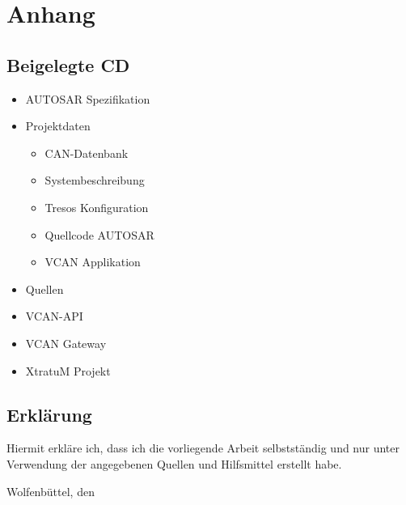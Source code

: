 \documentclass[
  a4paper,					    %
  twoside,
  DIV=calc,     				%
  bibliography=totoc,
  cleardoublepage=empty,
  ngerman,     					%
  final       					%
]{scrbook}
\begin{document}















\appendix
\part*{Anhang}





\backmatter


\chapter{Beigelegte CD}
\label{sec:BeigelegteCD}
\begin{itemize}
    \item AUTOSAR Spezifikation
    \item Projektdaten
    \begin{itemize}
        \item CAN-Datenbank
        \item Systembeschreibung
        \item Tresos Konfiguration
        \item Quellcode AUTOSAR
        \item VCAN Applikation
    \end{itemize}
    \item Quellen
    \item VCAN-API
    \item VCAN Gateway
    \item XtratuM Projekt
\end{itemize}


\chapter{Erklärung}
\label{sec:Erklärung}
Hiermit erkläre ich, dass ich die vorliegende Arbeit selbstständig und nur unter Verwendung der angegebenen Quellen und Hilfsmittel erstellt habe.
\vspace{2.5cm} \par
Wolfenbüttel, den %
\end{document}
